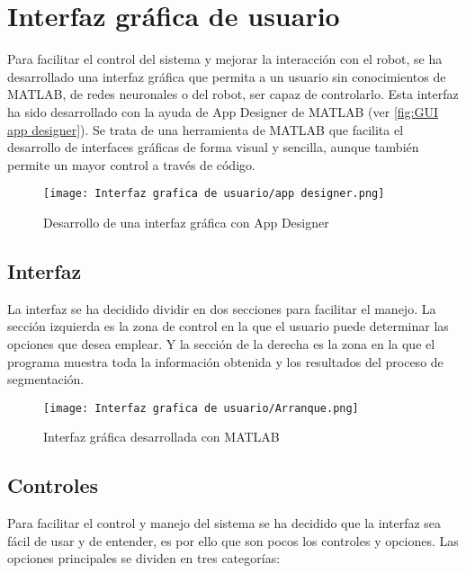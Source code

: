 \chapter{Interfaz gráfica de usuario}
\label{chap:GUI}

Para facilitar el control del sistema y mejorar la interacción con el robot, se ha desarrollado una interfaz gráfica que permita a un usuario sin conocimientos de MATLAB, de redes neuronales o del robot, ser capaz de controlarlo. Esta interfaz ha sido desarrollado con la ayuda de App Designer de MATLAB (ver \autoref{fig:GUI app designer}). Se trata de una herramienta de MATLAB que facilita el desarrollo de interfaces gráficas de forma visual y sencilla, aunque también permite un mayor control a través de código.

\begin{figure}[ht]  %
	\centering
	\texttt{[image: Interfaz grafica de usuario/app designer.png]}
	\caption{Desarrollo de una interfaz gráfica con App Designer}
	\label{fig:GUI app designer}
\end{figure}

\section{Interfaz}
La interfaz se ha decidido dividir en dos secciones para facilitar el manejo. La sección izquierda es la zona de control en la que el usuario puede determinar las opciones que desea emplear. Y la sección de la derecha es la zona en la que el programa muestra toda la información obtenida y los resultados del proceso de segmentación.

\begin{figure}[ht]  %
	\centering
	\texttt{[image: Interfaz grafica de usuario/Arranque.png]}
	\caption{Interfaz gráfica desarrollada con MATLAB}
	\label{fig:GUI arranque}
\end{figure}

\section{Controles}
Para facilitar el control y manejo del sistema se ha decidido que la interfaz sea fácil de usar y de entender, es por ello que son pocos los controles y opciones. Las opciones principales se dividen en tres categorías:

